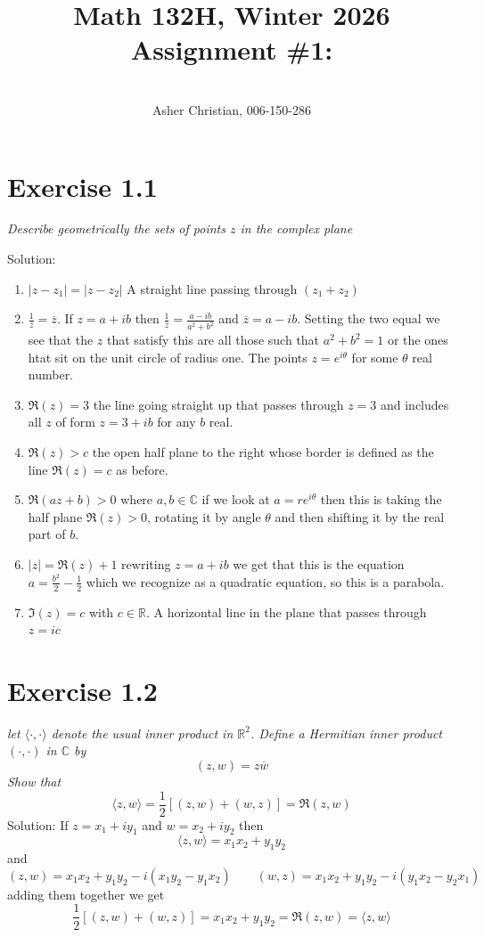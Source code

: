 \documentclass[11pt]{article}
\newcommand{\cnum}{Math 132H}
\newcommand{\ced}{Winter 2026}
\newcommand{\ctitle}[4]{\title{\vspace{-0.5in}\cnum, \ced\\Assignment #1: #2}\author{\vspace{-0.35in}\\#3, #4}}
\newcommand{\solution}[1]{{{\textcolor{header}{Solution:} \textcolor{solution}{#1}}}}
\begin{document}
\ctitle{\#1}{}{Asher Christian}{006-150-286}
\date{}
\maketitle
\section{Exercise 1.1}
\emph{
    Describe geometrically the sets of points $z$ in the complex plane
}
\solution{
    \begin{enumerate}
        \item $|z-z_1| = |z-z_2|$ A straight line passing through $(z_1+z_2)$
        \item $\frac{1}{z} = \overline{z}$. If $z = a + ib$ then  $\frac{1}{z} = \frac{a-ib}{a^2 + b^2}$ and $\overline{ z} = a-ib$.
            Setting the two equal we see that the $z$ that satisfy this are all those such that $a^2 + b^2 = 1$ or the ones htat sit on the unit circle of radius one. The points
            $z = e^{i\theta}$ for some $\theta$ real number.
        \item $\Re(z) = 3$ the line going straight up that passes through  $z = 3$ and includes all  $z$ of form $z = 3 +ib$ for any  $b$ real.
        \item  $\Re(z) > c$ the open half plane to the right whose border is defined as the line  $\Re(z) = c$ as before.
        \item $\Re(az + b) > 0$ where  $a,b \in \mathbb{C}$ if we look at $a = re^{i\theta}$ then this is taking the half plane $\Re(z) > 0$, rotating it by angle $\theta$ and then shifting it
            by the real part of $b$.
        \item  $|z| = \Re(z) + 1$ rewriting  $z = a +ib$ we get that this is the equation
             $a = \frac{b^2}{2} -\frac{1}{2}$ which we recognize as a quadratic equation, so this is a parabola.
         \item $\Im(z) = c$ with  $c \in \mathbb{R}$. A horizontal line in the plane that passes through $z = ic$
    \end{enumerate}
}
\section{Exercise 1.2}
\emph{
    let $\langle \cdot , \cdot \rangle$ denote the usual inner product in $ \mathbb{R}^2$.
    Define a Hermitian inner product $(\cdot, \cdot)$ in  $ \mathbb{C}$ by 
    \[
        (z,w) = z \overline{w}
    \] 
    Show that
    \[
        \langle z, w \rangle = \frac{1}{2}\left[(z,w) + (w,z)\right] = \Re(z,w)
    \] 
}
\solution{
    If $z = x_1 + iy_1$ and $w = x_2 + iy_2$ then
    \[
    \langle z, w \rangle = x_1x_2 + y_1y_2
    \] 
    and
    \[
        (z,w) = x_1x_2  + y_1y_2 -i(x_1y_2 -y_1x_2) \qquad (w,z) = x_1x_2 + y_1y_2 -i(y_1x_2 - y_2x_1)
    \] 
    adding them together we get
    \[
        \frac{1}{2}[(z,w) + (w,z)] = x_1x_2 + y_1y_2 = \Re(z,w) = \langle z, w \rangle
    \] 
}
\end{document}
